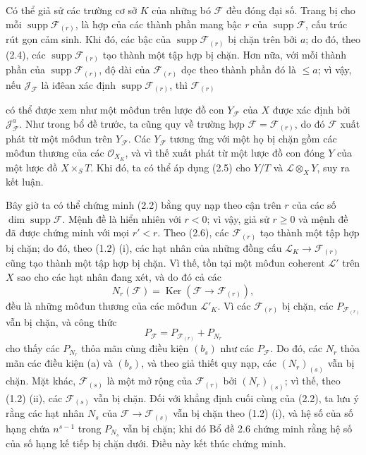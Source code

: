 \documentclass[11pt,twoside,openany]{book}
\numberwithin{equation}{section}
\newcommand{\src}[1]{%
  \phantomsection\hypertarget{src:\fgasourceid:#1}{}%
  \marginpar{\raggedleft\footnotesize\sffamily #1}%
}
\newcommand{\fgasourceid}{unset}
\begin{document}
Có thể giả sử các trường cơ sở $K$ của những bó $\mathcal F$ đều đóng đại số.
Trang bị cho mỗi $\operatorname{supp}\mathcal F_{(r)}$, là hợp của các thành
phần mang bậc $r$
của $\operatorname{supp}\mathcal F$, cấu trúc rút gọn cảm sinh. Khi đó, các
bậc của $\operatorname{supp}\mathcal F_{(r)}$ bị chặn trên bởi $a$; do đó,
theo (2.4), các $\operatorname{supp}\mathcal F_{(r)}$ tạo thành một tập hợp bị
chặn. Hơn nữa, với mỗi thành phần của
$\operatorname{supp}\mathcal F_{(r)}$, độ dài của $\mathcal F_{(r)}$ dọc theo
thành phần đó là $\leq a$; vì vậy, nếu $\mathcal J_{\mathcal F}$ là iđêan xác
định $\operatorname{supp}\mathcal F_{(r)}$, thì $\mathcal F_{(r)}$
\src{258}
có thể được xem như một môđun trên lược đồ con $Y_{\mathcal F}$ của $X$ được
xác định bởi $\mathcal J_{\mathcal F}^{a}$. Như trong bổ đề trước, ta cũng quy
về trường hợp $\mathcal F=\mathcal F_{(r)}$, do đó $\mathcal F$ xuất phát từ
một môđun trên $Y_{\mathcal F}$. Các $Y_{\mathcal F}$ tương ứng với một họ bị
chặn gồm các môđun thương của các $\mathcal O_{X_K}$, và vì thế xuất phát từ
một lược đồ con đóng $Y$ của một lược đồ $X\times_S T$. Khi đó, ta có thể áp
dụng (2.5) cho $Y/T$ và $\mathcal L\otimes_XY$, suy ra kết luận.

Bây giờ ta có thể chứng minh (2.2) bằng quy nạp theo cận trên $r$ của các số
$\dim\operatorname{supp}\mathcal F$. Mệnh đề là hiển nhiên với $r<0$; vì vậy,
giả sử $r\geq0$ và mệnh đề đã được chứng minh với mọi $r'<r$. Theo (2.6), các
$\mathcal F_{(r)}$ tạo thành một tập hợp bị chặn; do đó, theo (1.2) (i), các
hạt nhân của những đồng cấu
$\mathcal L_K\longrightarrow\mathcal F_{(r)}$ cũng tạo thành một tập hợp bị
chặn. Vì thế, tồn tại một môđun coherent $\mathcal L'$ trên $X$ sao cho các hạt
nhân đang xét, và do đó cả các
\[
N_r(\mathcal F)=\operatorname{Ker}(\mathcal F\longrightarrow\mathcal F_{(r)}),
\]
đều là những môđun thương của các môđun $\mathcal L'_K$. Vì các
$\mathcal F_{(r)}$ bị chặn, các $P_{\mathcal F_{(r)}}$ vẫn bị chặn, và công
thức
\[
P_{\mathcal F}=P_{\mathcal F_{(r)}}+P_{N_r}
\]
cho thấy các $P_{N_r}$ thỏa mãn cùng điều kiện $(b_s)$ như các
$P_{\mathcal F}$. Do đó, các $N_r$ thỏa mãn các điều kiện (a) và $(b_s)$, và
theo giả thiết quy nạp, các $(N_r)_{(s)}$ vẫn bị chặn. Mặt khác,
$\mathcal F_{(s)}$ là một mở rộng của $\mathcal F_{(r)}$ bởi
$(N_r)_{(s)}$; vì thế, theo (1.2) (ii), các $\mathcal F_{(s)}$ vẫn bị chặn.
Đối với khẳng định cuối cùng của (2.2), ta lưu ý rằng các hạt nhân $N_s$ của
$\mathcal F\longrightarrow\mathcal F_{(s)}$ vẫn bị chặn theo (1.2) (i), và hệ
số của số hạng chứa $n^{s-1}$ trong $P_{N_s}$ vẫn bị chặn; khi đó Bổ đề 2.6
chứng minh rằng hệ số của số hạng kế tiếp bị chặn dưới. Điều này kết thúc chứng
minh.
\end{document}
